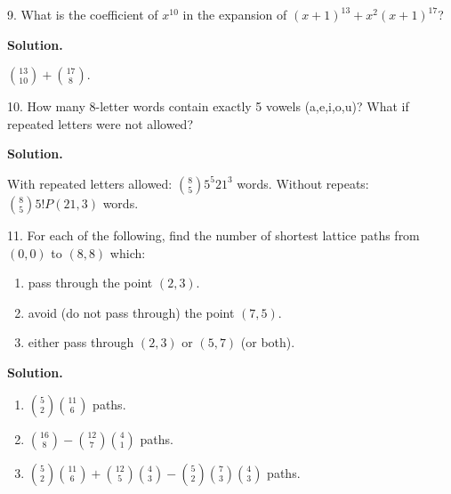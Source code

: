 \documentclass[10pt,]{book}
\theoremstyle{plain}
\theoremstyle{definition}
\theoremstyle{definition}
\theoremstyle{definition}
\numberwithin{equation}{section}
\begin{document}
\begin{exerciselist}
\item[9.]\hypertarget{exercise-110}{}
            What is the coefficient of \(x^{10}\) in the expansion of \((x+1)^{13} + x^2(x+1)^{17}\)?
\par\smallskip
\par\smallskip
\noindent\textbf{Solution.}\hypertarget{solution-161}{}\quad

            \({13 \choose 10} + {17 \choose 8}\).
\item[10.]\hypertarget{exercise-111}{}
            How many 8-letter words contain exactly 5 vowels (a,e,i,o,u)? What if repeated letters were not allowed?
\par\smallskip
\par\smallskip
\noindent\textbf{Solution.}\hypertarget{solution-162}{}\quad

            With repeated letters allowed: \({8 \choose 5}5^5 21^3\) words. Without repeats: \({8 \choose 5}5! P(21, 3)\) words.
\item[11.]\hypertarget{exercise-112}{}
            For each of the following, find the number of shortest lattice paths from \((0,0)\) to \((8,8)\) which:
          \leavevmode%
\begin{enumerate}[label=(\alph*)]
\item\hypertarget{li-741}{}
                pass through the point \((2,3)\).
\item\hypertarget{li-742}{}
                avoid (do not pass through) the point \((7,5)\).
\item\hypertarget{li-743}{}
                either pass through \((2,3)\) or \((5,7)\) (or both).
\end{enumerate}

\par\smallskip
\par\smallskip
\noindent\textbf{Solution.}\hypertarget{solution-163}{}\quad

            \leavevmode%
\begin{enumerate}[label=(\alph*)]
\item\hypertarget{li-744}{}\({5 \choose 2}{11 \choose 6}\) paths.%
\item\hypertarget{li-745}{}\({16 \choose 8} - {12 \choose 7}{4 \choose 1}\) paths.%
\item\hypertarget{li-746}{}\({5 \choose 2}{11 \choose 6} + {12 \choose 5}{4 \choose 3} - {5 \choose 2}{7 \choose 3}{4 \choose 3}\) paths.%
\end{enumerate}


\end{exerciselist}
\end{document}
